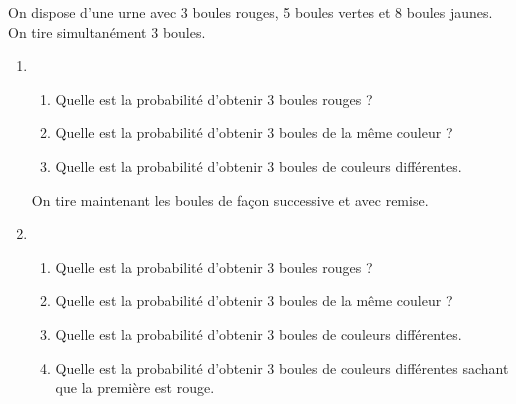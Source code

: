 \begin{exercice}
On dispose d'une urne avec 3 boules rouges, 5 boules vertes et 8 boules jaunes. 
On tire simultanément 3 boules.
\begin{enumerate}

\item 
\begin{enumerate}
\item Quelle est la probabilité d'obtenir 3 boules rouges ?
\item Quelle est la probabilité d'obtenir 3 boules de la même couleur ?
\item Quelle est la probabilité d'obtenir 3 boules de couleurs différentes. \\
\end{enumerate}
On tire maintenant les boules de façon successive et avec remise. 
\item 
\begin{enumerate}
\item Quelle est la probabilité d'obtenir 3 boules rouges ?
\item Quelle est la probabilité d'obtenir 3 boules de la même couleur ?
\item Quelle est la probabilité d'obtenir 3 boules de couleurs différentes. 
\item Quelle est la probabilité d'obtenir 3 boules de couleurs différentes sachant que la première est rouge. 
\end{enumerate}
\end{enumerate} 

\end{exercice}



